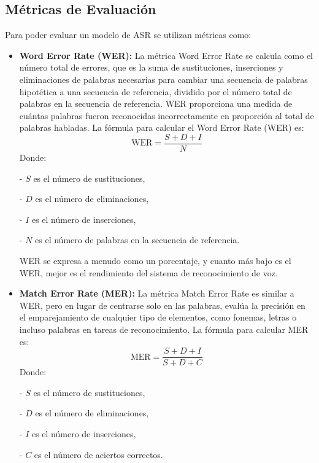\documentclass[conference]{IEEEtran}
\begin{document}
\subsection{Métricas de Evaluación}
Para poder evaluar un modelo de ASR se utilizan métricas como:
\begin{itemize}
    \item \textbf{Word Error Rate (WER):} La métrica Word Error Rate se calcula como el número total de errores, que es la suma de sustituciones, inserciones y eliminaciones de palabras necesarias para cambiar una secuencia de palabras hipotética a una secuencia de referencia, dividido por el número total de palabras en la secuencia de referencia. WER proporciona una medida de cuántas palabras fueron reconocidas incorrectamente en proporción al total de palabras habladas.
    La fórmula para calcular el Word Error Rate (WER) es:
    \begin{equation}
        \text{WER} = \frac{S + D + I}{N}
    \end{equation}
    Donde:
    
    - \( S \) es el número de sustituciones,
    
    - \( D \) es el número de eliminaciones,
    
    - \( I \) es el número de inserciones,
    
    - \( N \) es el número de palabras en la secuencia de referencia.
    
    WER se expresa a menudo como un porcentaje, y cuanto más bajo es el WER, mejor es el rendimiento del sistema de reconocimiento de voz.
    
    \item \textbf{ Match Error Rate (MER):} La métrica Match Error Rate es similar a WER, pero en lugar de centrarse solo en las palabras, evalúa la precisión en el emparejamiento de cualquier tipo de elementos, como fonemas, letras o incluso palabras en tareas de reconocimiento. La fórmula para calcular MER es:
    \begin{equation}
        \text{MER} = \frac{S + D + I}{S + D + C}
    \end{equation}
    Donde:
    
    - \( S \) es el número de sustituciones,
    
    - \( D \) es el número de eliminaciones,
    
    - \( I \) es el número de inserciones,
    
    - \( C \) es el número de aciertos correctos.
    

\end{itemize}
\end{document}
